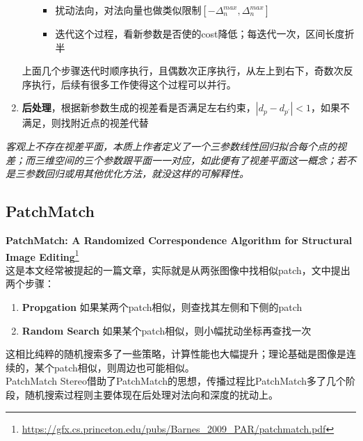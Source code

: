 \begin{enumerate}
\begin{itemize}
\begin{itemize}
						\item 扰动法向，对法向量也做类似限制$[-\Delta_{n}^{max}, \Delta_{n}^{max}]$

						\item 迭代这个过程，看新参数是否使的cost降低；每迭代一次，区间长度折半
					\end{itemize}
			\end{itemize}

			上面几个步骤迭代时顺序执行，且偶数次正序执行，从左上到右下，奇数次反序执行，后续有很多工作使得这个过程可以并行。

		\item \textbf{后处理}，根据新参数生成的视差看是否满足左右约束，$|d_p - d_{p^\prime}| <1$，如果不满足，则找附近点的视差代替

	\end{enumerate}

\textit{客观上不存在视差平面，本质上作者定义了一个三参数线性回归拟合每个点的视差；而三维空间的三个参数跟平面一一对应，如此便有了视差平面这一概念；若不是三参数回归或用其他优化方法，就没这样的可解释性。}

\subsection{PatchMatch}

\textbf{PatchMatch: A Randomized Correspondence Algorithm for Structural Image Editing}\protect\footnote{\url{https://gfx.cs.princeton.edu/pubs/Barnes_2009_PAR/patchmatch.pdf}}\\

这是本文经常被提起的一篇文章，实际就是从两张图像中找相似patch，文中提出两个步骤：
\begin{enumerate}
	\item \textbf{Propgation} 如果某两个patch相似，则查找其左侧和下侧的patch
	\item \textbf{Random Search} 如果某个patch相似，则小幅扰动坐标再查找一次
\end{enumerate}

这相比纯粹的随机搜索多了一些策略，计算性能也大幅提升；理论基础是图像是连续的，某个patch相似，则周边也可能相似。\\

PatchMatch Stereo借助了PatchMatch的思想，传播过程比PatchMatch多了几个阶段，随机搜索过程则主要体现在后处理对法向和深度的扰动上。
